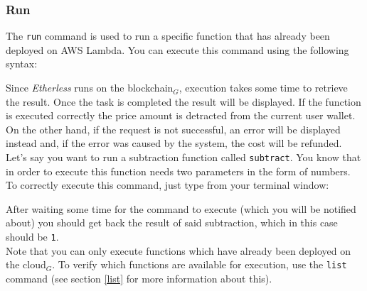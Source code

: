 \subsubsection{Run}
The \texttt{run} command is used to run a specific function that has already been deployed on AWS Lambda. You can execute this command using the following syntax: \\
\begin{center}
\end{center}
Since \textit{Etherless} runs on the blockchain$_{G}$, execution takes some time to retrieve the result. Once the task is completed the result will be displayed. If the function is executed correctly the price amount is detracted from the current user wallet. On the other hand, if the request is not successful, an error will be displayed instead and, if the error was caused by the system, the cost will be refunded.
Let's say you want to run a subtraction function called \texttt{subtract}. You know that in order to execute this function needs two parameters in the form of numbers. To correctly execute this command, just type from your terminal window:
\begin{center}
\end{center}
After waiting some time for the command to execute (which you will be notified about) you should get back the result of said subtraction, which in this case should be \texttt{1}. \\
Note that you can only execute functions which have already been deployed on the cloud$_{G}$. To verify which functions are available for execution, use the \texttt{list} command (see section \ref{list} for more information about this).

